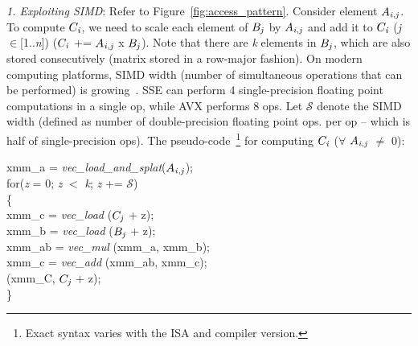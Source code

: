      \vspace*{0.05in}
     {\it{1. Exploiting SIMD}}: Refer to Figure~\ref{fig:access_pattern}. 
     Consider element $A_{{\it{i}},{\it{j}}}$. To compute
     $C_{\it{i}}$, we need to scale each element of
     $B_{{\it{j}}}$ by  $A_{{\it{i}},{\it{j}}}$ and add it to
     $C_{\it{i}}$ ({\it{j}}$\in$[1..{\it{n}}]) ($C_{\it{i}}$ +=
     $A_{{\it{i}},{\it{j}}}$ x $B_{{\it{j}}}$). Note that there are
     {\it{k}} elements in $B_{{\it{j}}}$, which are also stored
     consecutively (matrix stored in a row-major fashion).
     On modern computing platforms, SIMD width (number of simultaneous
     operations that can be performed) is
     growing~\cite{intel2}. SSE can perform 4
     single-precision floating point computations in a single op, while
     AVX %
     performs 8 ops. Let $\mathcal{S}$ denote the SIMD width
     (defined as number of double-precision floating point ops. per op
     -- which is half of single-precision ops).
     The pseudo-code~\footnote{Exact syntax varies with the ISA and
     compiler version.} for computing $C_{\it{i}}$ ($\forall$
     $A_{{\it{i}},{\it{j}}}$ $\neq$ 0):
     \vspace*{0.03in}

     \hspace*{-0.13in}xmm\_a = {\it{vec\_load\_and\_splat}}($A_{{\it{i}},{\it{j}}}$); \\
     for\hspace*{0.02in}({\it{z}} = 0; {\it{z}} $<$ {\it{k}}; {\it{z}} += $\mathcal{S}$)\\
     \{\\
         \hspace*{0.2in}xmm\_c = {\it{vec\_load}}  ($C_{{\it{j}}}$ + z); \\
         \hspace*{0.2in}xmm\_b = {\it{vec\_load}}  ($B_{{\it{j}}}$ + z); \\
         \hspace*{0.2in}xmm\_ab = {\it{vec\_mul}}  (xmm\_a, xmm\_b); \\
         \hspace*{0.2in}xmm\_c = {\it{vec\_add}}  (xmm\_ab, xmm\_c); \\
          (xmm\_C,  $C_{{\it{j}}}$ + z); \\
     \}\\

